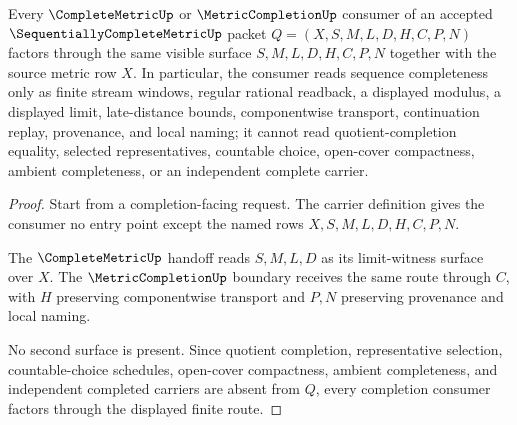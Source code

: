 \begin{theorem}
\label{thm:sequentially-complete-metric-completion-consumer-factorization}
Every $\CompleteMetricUp$ or $\MetricCompletionUp$ consumer of an accepted $\SequentiallyCompleteMetricUp$ packet $Q=(X,S,M,L,D,H,C,P,N)$ factors through the same visible surface $S,M,L,D,H,C,P,N$ together with the source metric row $X$. In particular, the consumer reads sequence completeness only as finite stream windows, regular rational readback, a displayed modulus, a displayed limit, late-distance bounds, componentwise transport, continuation replay, provenance, and local naming; it cannot read quotient-completion equality, selected representatives, countable choice, open-cover compactness, ambient completeness, or an independent complete carrier.
\end{theorem}
\begin{proof}
Start from a completion-facing request. The carrier definition gives the consumer no entry point except the named rows $X,S,M,L,D,H,C,P,N$.

The $\CompleteMetricUp$ handoff reads $S,M,L,D$ as its limit-witness surface over $X$. The $\MetricCompletionUp$ boundary receives the same route through $C$, with $H$ preserving componentwise transport and $P,N$ preserving provenance and local naming.

No second surface is present. Since quotient completion, representative selection, countable-choice schedules, open-cover compactness, ambient completeness, and independent completed carriers are absent from $Q$, every completion consumer factors through the displayed finite route.
\end{proof}

